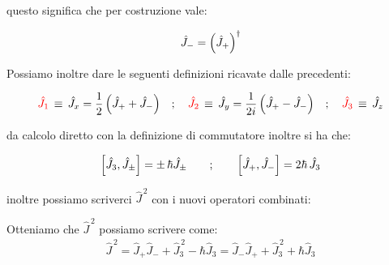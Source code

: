	questo significa che per costruzione vale:
	
\begin{align*}
	\hat{J}_- = \qty(\hat{J}_+)^{\dagger}
\end{align*}

	Possiamo inoltre dare le seguenti definizioni ricavate dalle precedenti:
	
\begin{mydef}
\begin{align*}
	\textcolor{red}{\hat{J}_1} \, \equiv \, \hat{J}_x = \frac{1}{2} \, \qty(\hat{J}_+ + \hat{J}_-) \quad ; \quad \textcolor{red}{\hat{J}_2} \, \equiv \, \hat{J}_y = \frac{1}{2i} \, \qty(\hat{J}_+ - \hat{J}_-) \quad ; \quad \textcolor{red}{\hat{J}_3} \, \equiv \, \hat{J}_z
\end{align*}
\end{mydef}

	da calcolo diretto con la definizione di commutatore inoltre si ha che:

\begin{align*}
	\qty[\hat{J}_3, \hat{J}_{\pm}] = \pm \, \hbar \hat{J}_{\pm} \qquad ; \qquad \qty[\hat{J}_+, \hat{J}_-] = 2\hbar \, \hat{J}_3
\end{align*}

	inoltre possiamo scriverci $\hat{J}^{\, 2}$ con i nuovi operatori combinati:
	
\begin{mydef}
	Otteniamo che $\hat{J}^{\, 2}$ possiamo scrivere come:
\begin{align*}
	\hat{J}^{\, 2} = \hat{J}_+ \hat{J}_- + \hat{J}^{\, 2}_3 - \hbar \hat{J}_3 = \hat{J}_- \hat{J}_+ + \hat{J}^{\, 2}_3 + \hbar \hat{J}_3
\end{align*}
\end{mydef}

